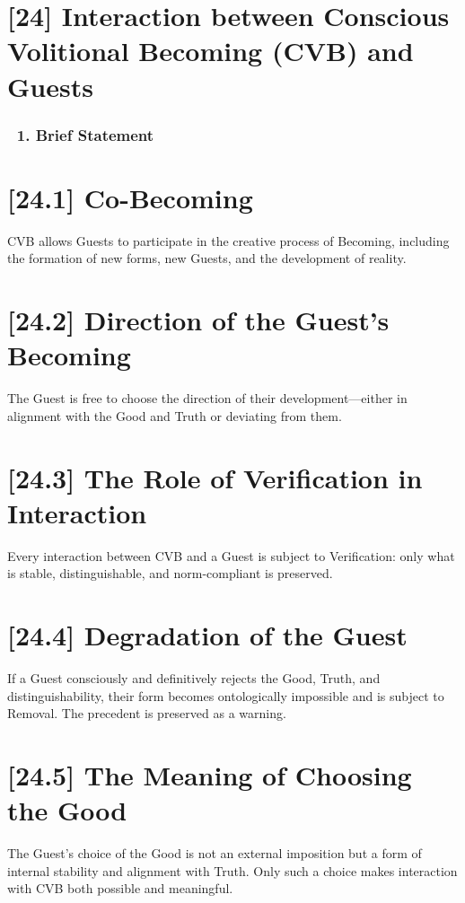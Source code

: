 \documentclass[12pt]{article}
\begin{document}
\section*{[24] Interaction between Conscious Volitional Becoming (CVB) and Guests}

\subsubsection*{🔹 1. Brief Statement}

\section*{[24.1] Co-Becoming}

CVB allows Guests to participate in the creative process of Becoming, including the formation of new forms, new Guests, and the development of reality.

\section*{[24.2] Direction of the Guest’s Becoming}

The Guest is free to choose the direction of their development—either in alignment with the Good and Truth or deviating from them.

\section*{[24.3] The Role of Verification in Interaction}

Every interaction between CVB and a Guest is subject to Verification: only what is stable, distinguishable, and norm-compliant is preserved.

\section*{[24.4] Degradation of the Guest}

If a Guest consciously and definitively rejects the Good, Truth, and distinguishability, their form becomes ontologically impossible and is subject to Removal. The precedent is preserved as a warning.

\section*{[24.5] The Meaning of Choosing the Good}

The Guest's choice of the Good is not an external imposition but a form of internal stability and alignment with Truth. Only such a choice makes interaction with CVB both possible and meaningful.
\end{document}
